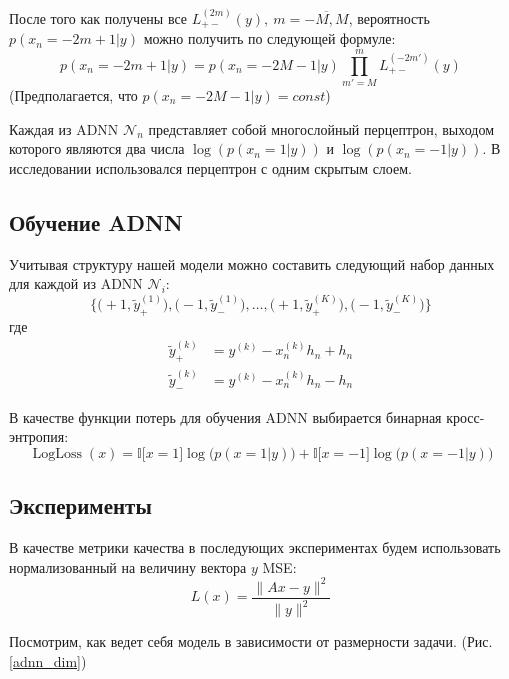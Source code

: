 \documentclass[12pt]{article}
\begin{document}
После того как получены все $L_{+-}^{(2m)}(y), \ m = \overline{-M, M}$, вероятность $p(x_n = - 2m + 1 | y)$ можно получить по следующей формуле:
    $$
    p( x_n = -2m + 1 | y) = p(x_n = -2M - 1 | y) \prod_{m' = M}^{m} L_{+-}^{(-2m')}(y)
    $$
(Предполагается, что $p(x_n = -2M - 1 | y) = const$)

Каждая из ADNN $\mathcal{N}_n$ представляет собой многослойный перцептрон, выходом которого являются два числа $\log(p(x_n = 1 | y))$ и $\log(p(x_n = -1 | y))$. В исследовании использовался перцептрон с одним скрытым слоем.

\subsection{Обучение ADNN}

Учитывая структуру нашей модели можно составить следующий набор данных для каждой из ADNN $\mathcal{N}_i$:
    $$
    \bigg\{ \Big( {+}1, \tilde y_+^{(1)} \Big), \Big( {-}1, \tilde y_-^{(1)} \Big), \ldots, \Big( {+}1, \tilde y_+^{(K)} \Big), \Big( {-}1, \tilde y_-^{(K)} \Big) \bigg\}
    $$
где
    $$
    \begin{aligned}
        \tilde y_+^{(k)} &= y^{(k)} - x_n^{(k)}h_n + h_n \\
        \tilde y_-^{(k)} &= y^{(k)} - x_n^{(k)}h_n - h_n
    \end{aligned}
    $$

В качестве функции потерь для обучения ADNN выбирается бинарная кросс-энтропия:
$$
\operatorname{LogLoss}(x) = \mathbb{I} \big [ x = 1 \big] \log \big( p(x = 1 | y) \big) + \mathbb{I} \big [ x = -1 \big] \log \big( p(x = -1 | y) \big)
$$

\subsection{Эксперименты}

В качестве метрики качества в последующих экспериментах будем использовать нормализованный на величину вектора $y$ MSE:
$$
L(x) = \frac{\|Ax - y\|^2}{\|y\|^2}
$$

Посмотрим, как ведет себя модель в зависимости от размерности задачи. (Рис. \ref{adnn_dim}) 
\end{document}
